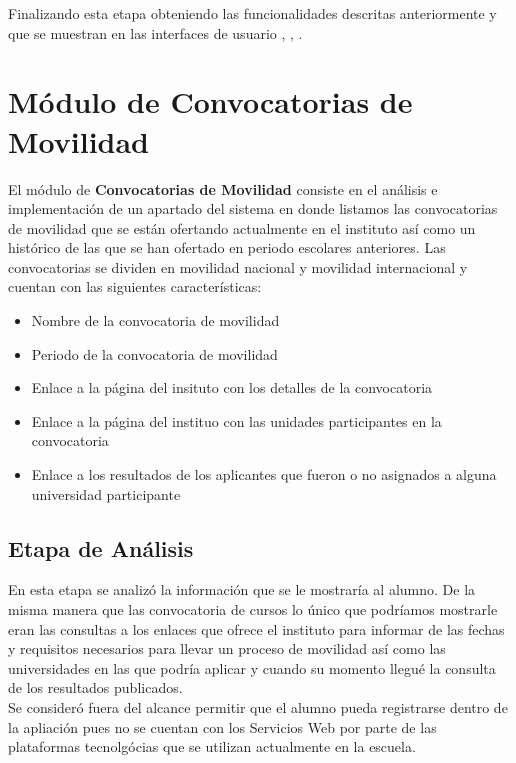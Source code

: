  Finalizando esta etapa obteniendo las funcionalidades descritas anteriormente y que se muestran en las interfaces de usuario , , . \\
 
 \section{Módulo de Convocatorias de Movilidad}
 El módulo de \textbf{Convocatorias de Movilidad} consiste en el análisis e implementación de un apartado del sistema en donde listamos las convocatorias de movilidad que se están ofertando actualmente en el instituto así como un histórico de las que se han ofertado en periodo escolares anteriores. Las convocatorias se dividen en movilidad nacional y movilidad internacional y cuentan con las siguientes características:
 \begin{itemize}
 	\item Nombre de la convocatoria de movilidad
 	\item Periodo de la convocatoria de movilidad
 	\item Enlace a la página del insituto con los detalles de la convocatoria
 	\item Enlace a la página del instituo con las unidades participantes en la convocatoria
 	\item Enlace a los resultados de los aplicantes que fueron o no asignados a alguna universidad participante
 \end{itemize}  
 
 \subsection{Etapa de Análisis}
 En esta etapa se analizó la información que se le mostraría al alumno. De la misma manera que las convocatoria de cursos lo único que podríamos mostrarle eran las consultas a los enlaces que ofrece el instituto para informar de las fechas y requisitos necesarios para llevar un proceso de movilidad así como las universidades en las que podría aplicar y cuando su momento llegué la consulta de los resultados publicados. \\
 Se consideró fuera del alcance permitir que el alumno pueda registrarse dentro de la apliación pues no se cuentan con los Servicios Web por parte de las plataformas tecnolgócias que se utilizan actualmente en la escuela. \\
 
